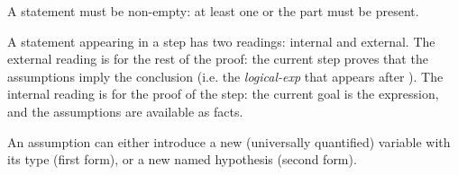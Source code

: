 \begin{syn}
 \is
\end{syn}

A statement must be non-empty: at least one  or the
 part must be present.

A statement appearing in a step has two readings: internal and
external.  The external reading is for the rest of the
proof: the current step proves that the assumptions imply the
conclusion (i.e. the {\em logical-exp} that appears after
).  The internal reading is for the proof of the step:
the current goal is the  expression, and the
assumptions are available as facts.

\begin{syn}
 \is
      
\alt{} \tok{ :} 
\end{syn}


An assumption can either introduce a new (universally quantified)
variable with its type (first form), or a new named hypothesis (second
form).

\begin{syn}
 \is
\alt {}
\alt {}
\alt {}
\end{syn}

